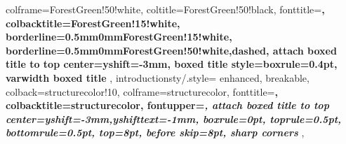 {{						   colframe=ForestGreen!50!white,
                           coltitle=ForestGreen!50!black,
						   fonttitle=\bfseries,
						   colbacktitle=ForestGreen!15!white,
                           borderline={0.5mm}{0mm}{ForestGreen!15!white},
                           borderline={0.5mm}{0mm}{ForestGreen!50!white,dashed},
                           attach boxed title to top center={yshift=-3mm},
                           boxed title style={boxrule=0.4pt},
						   varwidth boxed title
						   },
        introductionsty/.style={
                           enhanced,
                           breakable,
                           colback=structurecolor!10,
                           colframe=structurecolor,
                           fonttitle=\bfseries,
                           colbacktitle=structurecolor,
                           fontupper=\itshape,
                           attach boxed title to top center={yshift=-3mm,yshifttext=-1mm},
                           boxrule=0pt,
                           toprule=0.5pt,
                           bottomrule=0.5pt,
                           top=8pt,
                           before skip=8pt,
                           sharp corners
                         },
    }
